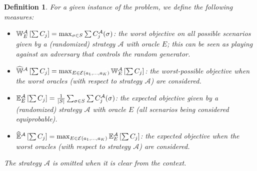 \documentclass{article}
\newtheorem{definition}{Definition}
\begin{document}
\begin{definition}
    For a given instance of the problem, we define the following measures:
    \begin{itemize}
        \item \(\mathbb{W}^{\mathcal{A}}_E\left[\sum C_j\right]=\max_{\sigma\in S}\sum C^{\mathcal{A}}_j(\sigma)\):
        the worst objective on all possible scenarios given by a (randomized) strategy \(\mathcal{A}\) with oracle \(E\); this can be seen as playing against an adversary that controls the random generator.
        \item \(\widehat{\mathbb{W}}^{\mathcal{A}}\left[\sum C_j\right]=\max_{E\in\mathcal{E}(a_1,\ldots,a_K)} \mathbb{W}^{\mathcal{A}}_E\left[\sum C_j\right]\):
        the worst-possible objective when the worst oracles (with respect to strategy \(\mathcal{A}\)) are considered.
        \item \(\mathbb{E}^{\mathcal{A}}_E\left[\sum C_j\right]=\frac{1}{|S|}\sum_{\sigma\in S}\sum C^{\mathcal{A}}_j(\sigma)\):
        the expected objective given by a (randomized) strategy \(\mathcal{A}\) with oracle \(E\) (all scenarios being considered equiprobable).
        \item \(\widehat{\mathbb{E}}^{\mathcal{A}}\left[\sum C_j\right]=\max_{E\in\mathcal{E}(a_1,\ldots,a_K)} \mathbb{E}^{\mathcal{A}}_E\left[\sum C_j\right]\):
        the expected objective when the worst oracles (with respect to strategy \(\mathcal{A}\)) are considered.
    \end{itemize}
    The strategy \(\mathcal{A}\) is omitted when it is clear from the context.
\end{definition}

\end{document}

